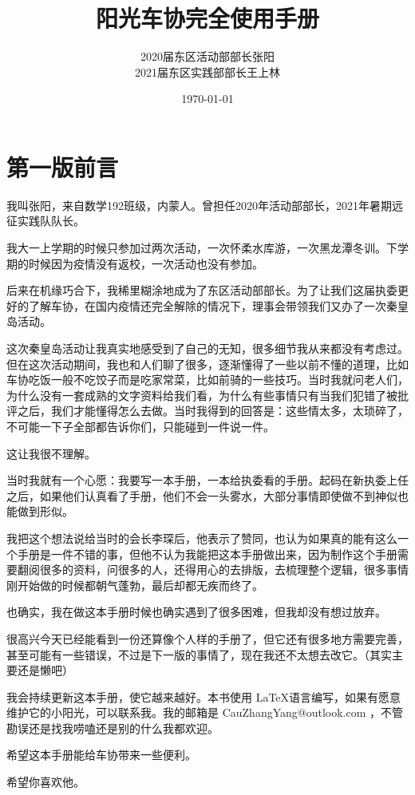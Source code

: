 \documentclass{ctexbook}
\title{阳光车协完全使用手册}
\author{
    2020届东区活动部部长张阳\\
    2021届东区实践部部长王上林
    }
\date{\today}
\begin{document}
\setlength{\baselineskip}{22pt}
\maketitle
\newpage
\frontmatter

\chapter{第一版前言}
我叫张阳，来自数学192班级，内蒙人。曾担任2020年活动部部长，2021年暑期远征实践队队长。

我大一上学期的时候只参加过两次活动，一次怀柔水库游，一次黑龙潭冬训。下学期的时候因为疫情没有返校，一次活动也没有参加。

后来在机缘巧合下，我稀里糊涂地成为了东区活动部部长。为了让我们这届执委更好的了解车协，在国内疫情还完全解除的情况下，理事会带领我们又办了一次秦皇岛活动。

这次秦皇岛活动让我真实地感受到了自己的无知，很多细节我从来都没有考虑过。但在这次活动期间，我也和人们聊了很多，逐渐懂得了一些以前不懂的道理，比如车协吃饭一般不吃饺子而是吃家常菜，比如前骑的一些技巧。当时我就问老人们，为什么没有一套成熟的文字资料给我们看，为什么有些事情只有当我们犯错了被批评之后，我们才能懂得怎么去做。当时我得到的回答是：这些情太多，太琐碎了，不可能一下子全部都告诉你们，只能碰到一件说一件。

这让我很不理解。

当时我就有一个心愿：我要写一本手册，一本给执委看的手册。起码在新执委上任之后，如果他们认真看了手册，他们不会一头雾水，大部分事情即使做不到神似也能做到形似。

我把这个想法说给当时的会长李琛后，他表示了赞同，也认为如果真的能有这么一个手册是一件不错的事，但他不认为我能把这本手册做出来，因为制作这个手册需要翻阅很多的资料，问很多的人，还得用心的去排版，去梳理整个逻辑，很多事情刚开始做的时候都朝气蓬勃，最后却都无疾而终了。

也确实，我在做这本手册时候也确实遇到了很多困难，但我却没有想过放弃。

很高兴今天已经能看到一份还算像个人样的手册了，但它还有很多地方需要完善，甚至可能有一些错误，不过是下一版的事情了，现在我还不太想去改它。（其实主要还是懒吧）


我会持续更新这本手册，使它越来越好。本书使用 \LaTeX 语言编写，如果有愿意维护它的小阳光，可以联系我。我的邮箱是 CauZhangYang@outlook.com ，不管勘误还是找我唠嗑还是别的什么我都欢迎。

希望这本手册能给车协带来一些便利。

希望你喜欢他。
\end{document}
